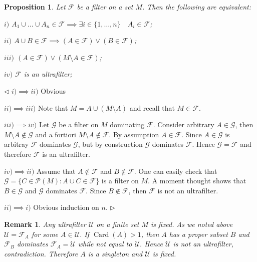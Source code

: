 \documentclass[12pt]{article}
\newtheorem{proposition}[theorem]{Proposition}
\newtheorem{remark}[theorem]{Remark}
\newenvironment{proof}{\par $\triangleleft$}{$\triangleright$}
\begin{document}
\begin{proposition}\label{PrUltraFilterCharac} Let $\mathcal{F}$ be a filter on a set $M$. Then the following are equivalent:

$i)$ $A_1\cup\ldots\cup A_n\in\mathcal{F}\implies\exists i\in\{1,\ldots,n\}\quad A_i\in\mathcal{F}$;

$ii)$ $A\cup B\in\mathcal{F}\implies (A\in\mathcal{F})\vee (B\in\mathcal{F})$;

$iii)$ $(A\in\mathcal{F})\vee(M\setminus A\in\mathcal{F})$;

$iv)$ $\mathcal{F}$ is an ultrafilter;
\end{proposition}
\begin{proof} $i)\implies ii)$ Obvious

$ii)\implies iii)$ Note that $M=A\cup(M\setminus A)$ and recall that $M\in\mathcal{F}$.

$iii)\implies iv)$ Let $\mathcal{G}$ be a filter on $M$ dominating $\mathcal{F}$. Consider arbitrary $A\in\mathcal{G}$, then $M\setminus A\notin\mathcal{G}$ and a fortiori $M\setminus A\notin\mathcal{F}$. By assumption $A\in\mathcal{F}$. Since $A\in\mathcal{G}$ is arbitray $\mathcal{F}$ dominates $\mathcal{G}$, but by construction $\mathcal{G}$ dominates $\mathcal{F}$. Hence $\mathcal{G}=\mathcal{F}$ and therefore $\mathcal{F}$ is an ultrafilter.

$iv)\implies ii)$ Assume that $A\notin\mathcal{F}$ and $B\notin\mathcal{F}$. One can easily check that $\mathcal{G}=\{C\in\mathcal{P}(M):A\cup C\in\mathcal{F}\}$ is a filter on $M$. A moment thought shows that $B\in\mathcal{G}$ and $\mathcal{G}$ dominates $\mathcal{F}$. Since $B\notin \mathcal{F}$, then $\mathcal{F}$ is not an ultrafilter.

$ii)\implies i)$ Obvious induction on $n$.
\end{proof}

\begin{remark}\label{RemDescOfUltrafiltersOnFiniteSets}
Any ultrafilter $\mathcal{U}$ on a finite set $M$ is fixed. As we noted above $\mathcal{U}=\mathcal{F}_A$ for some $A\in\mathcal{U}$. If $\operatorname{Card}(A)>1$, then $A$ has a proper subset $B$ and $\mathcal{F}_B$ dominates $\mathcal{F}_A=\mathcal{U}$ while not equal to $\mathcal{U}$. Hence $\mathcal{U}$ is not an ultrafilter, contradiction. Therefore $A$ is a singleton and $\mathcal{U}$ is fixed.
\end{remark}
\end{document}
